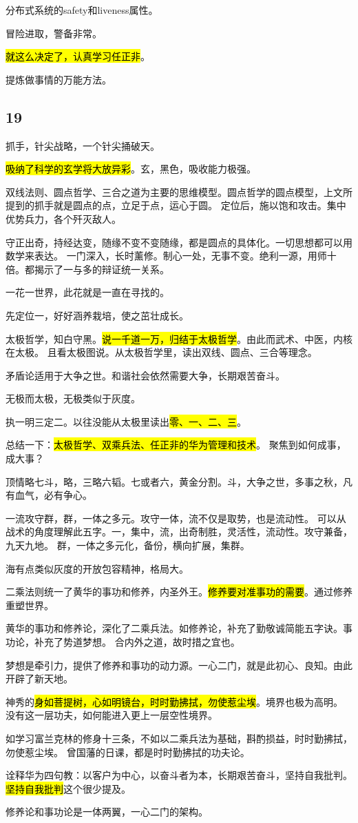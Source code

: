 分布式系统的safety和liveness属性。

冒险进取，警备非常。

\hl{就这么决定了，认真学习任正非}。

\hrulefill

提炼做事情的万能方法。

\subsection{19}

抓手，针尖战略，一个针尖捅破天。

\hl{吸纳了科学的玄学将大放异彩}。玄，黑色，吸收能力极强。

双线法则、圆点哲学、三合之道为主要的思维模型。圆点哲学的圆点模型，上文所提到的抓手就是圆点的点，立足于点，运心于圆。
定位后，施以饱和攻击。集中优势兵力，各个歼灭敌人。

守正出奇，持经达变，随缘不变不变随缘，都是圆点的具体化。一切思想都可以用数学来表达。
一门深入，长时薰修。制心一处，无事不变。绝利一源，用师十倍。都揭示了一与多的辩证统一关系。

一花一世界，此花就是一直在寻找的。

先定位一，好好涵养栽培，使之茁壮成长。

\hrulefill

太极哲学，知白守黑。\hl{说一千道一万，归结于太极哲学}。由此而武术、中医，内核在太极。
且看太极图说。从太极哲学里，读出双线、圆点、三合等理念。

矛盾论适用于大争之世。和谐社会依然需要大争，长期艰苦奋斗。

无极而太极，无极类似于灰度。

执一明三定二。以往没能从太极里读出\hl{零、一、二、三}。

总结一下：\hl{太极哲学、双乘兵法、任正非的华为管理和技术}。
聚焦到如何成事，成大事？

顶情略七斗，略，三略六韬。七或者六，黄金分割。斗，大争之世，多事之秋，凡有血气，必有争心。

一流攻守群，群，一体之多元。攻守一体，流不仅是取势，也是流动性。
可以从战术的角度理解此五字。一，集中，流，出奇制胜，灵活性，流动性。攻守兼备，九天九地。
群，一体之多元化，备份，横向扩展，集群。

海有点类似灰度的开放包容精神，格局大。

\hrulefill

二乘法则统一了黄华的事功和修养，内圣外王。\hl{修养要对准事功的需要}。通过修养重塑世界。

黄华的事功和修养论，深化了二乘兵法。如修养论，补充了勤敬诚简能五字诀。事功论，补充了势道梦想。
合内外之道，故时措之宜也。

梦想是牵引力，提供了修养和事功的动力源。一心二门，就是此初心、良知。由此开辟了新天地。

神秀的\hl{身如菩提树，心如明镜台，时时勤拂拭，勿使惹尘埃}。境界也极为高明。
没有这一层功夫，如何能进入更上一层空性境界。

如学习富兰克林的修身十三条，不如以二乘兵法为基础，斟酌损益，时时勤拂拭，勿使惹尘埃。
曾国藩的日课，都是时时勤拂拭的功夫论。

诠释华为四句教：以客户为中心，以奋斗者为本，长期艰苦奋斗，坚持自我批判。
\hl{坚持自我批判}这个很少提及。

\hrulefill

修养论和事功论是一体两翼，一心二门的架构。
